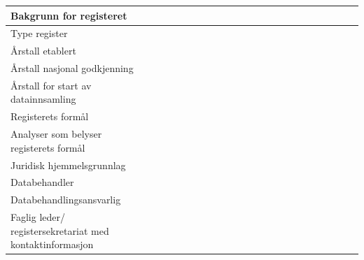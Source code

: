 \documentclass{article}
\begin{document}
    \begin{center}
        \begin{longtable}{| p{0.4\linewidth} | p{0.6\linewidth} |} \hline
            Bakgrunn for registeret	& 
            
            \\ \hline
            Type register &
            
            \\ \hline
            Årstall etablert &
            
            \\ \hline
            Årstall nasjonal godkjenning &
            
            \\ \hline
            Årstall for start av datainnsamling &
            
            \\ \hline
            Registerets formål &
            
            \\ \hline
            Analyser som belyser registerets formål &
            
            \\ \hline
            Juridisk hjemmelsgrunnlag &
            
            \\ \hline
            Databehandler &
            
            \\ \hline
            Databehandlingsansvarlig &
            
            \\ \hline 
            Faglig leder/ registersekretariat med kontaktinformasjon &
            

\end{longtable}
\end{center}
\end{document}
